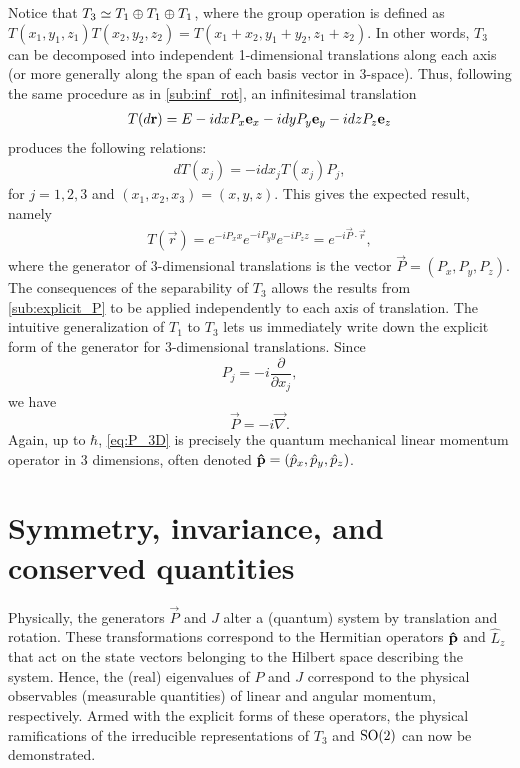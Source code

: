     Notice that $T_3\simeq T_1 \oplus T_1 \oplus T_1$, where the group operation is defined as $T(x_1,y_1,z_1)T(x_2,y_2,z_2) = T(x_1+x_2,y_1+y_2,z_1+z_2)$. In other words, $T_3$ can be decomposed into independent 1-dimensional translations along each axis (or more generally along the span of each basis vector in 3-space). Thus, following the same procedure as in \cref{sub:inf_rot}, an infinitesimal translation
    \begin{align*}
        T(d\mathbf{r}) = E - i dx P_x\mathbf{e}_x - idy P_y\mathbf{e}_y - idz P_z\mathbf{e}_z
    \end{align*}
    produces the following relations:
    \begin{align*}
        dT(x_j) = -idx_j T(x_j)P_j,
    \end{align*}
    for $j=1,2,3$ and $(x_1,x_2,x_3) = (x,y,z)$.
    This gives the expected result, namely
    \begin{align*}
        T(\vec{r}) = e^{-iP_x x}e^{-iP_y y}e^{-iP_z z} = e^{-i\vec{P}\cdot\vec{r}},
    \end{align*}
    where the generator of 3-dimensional translations is the vector $\vec{P}=(P_x,P_y,P_z)$. The consequences of the separability of $T_3$ allows the results from \cref{sub:explicit_P} to be applied independently to each axis of translation. The intuitive generalization of $T_1$ to $T_3$ lets us immediately write down the explicit form of the generator for 3-dimensional translations. Since
    \begin{equation}
        P_j = -i\frac{\partial}{\partial x_j},
    \end{equation}
    we have
    \begin{equation}
        \vec{P} = -i\vec{\nabla}.\label{eq:P_3D}
    \end{equation}
    Again, up to $\hbar$, \cref{eq:P_3D} is precisely the quantum mechanical linear momentum operator in 3 dimensions, often denoted $\mathbf{\hat{p}}=(\hat{p}_x,\hat{p}_y,\hat{p}_z)$.


    \section{Symmetry, invariance, and conserved quantities}\label{sec:PJ_physical}

    Physically, the generators $\vec{P}$ and $J$ alter a (quantum) system by translation and rotation. These transformations correspond to the Hermitian operators $\mathbf{\hat{p}}$ and $\hat{L}_z$ that act on the state vectors belonging to the Hilbert space describing the system. Hence, the (real) eigenvalues of $P$ and $J$ correspond to the physical observables (measurable quantities) of linear and angular momentum, respectively. Armed with the explicit forms of these operators, the physical ramifications of the irreducible representations of $T_3$ and $\textrm{SO}{(2)}$ can now be demonstrated.
    
